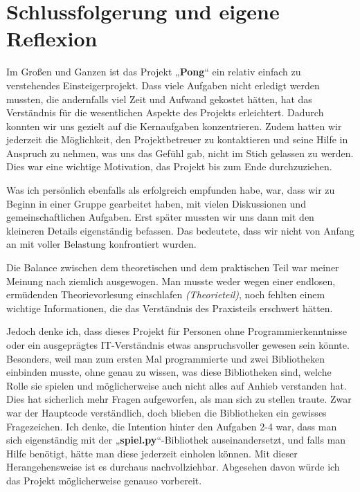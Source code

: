\documentclass[a4paper,12pt]{article}
\begin{document}
\section{Schlussfolgerung und eigene Reflexion}
Im Großen und Ganzen ist das Projekt „\textbf{Pong}“ ein relativ einfach zu verstehendes Einsteigerprojekt. Dass viele Aufgaben nicht erledigt werden mussten, die andernfalls viel Zeit und Aufwand gekostet hätten, hat das Verständnis für die wesentlichen Aspekte des Projekts erleichtert. Dadurch konnten wir uns gezielt auf die Kernaufgaben konzentrieren. Zudem hatten wir jederzeit die Möglichkeit, den Projektbetreuer zu kontaktieren und seine Hilfe in Anspruch zu nehmen, was uns das Gefühl gab, nicht im Stich gelassen zu werden. Dies war eine wichtige Motivation, das Projekt bis zum Ende durchzuziehen. \par \vspace\baselineskip
Was ich persönlich ebenfalls als erfolgreich empfunden habe, war, dass wir zu Beginn in einer Gruppe gearbeitet haben, mit vielen Diskussionen und gemeinschaftlichen Aufgaben. Erst später mussten wir uns dann mit den kleineren Details eigenständig befassen. Das bedeutete, dass wir nicht von Anfang an mit voller Belastung konfrontiert wurden. \par \vspace\baselineskip
Die Balance zwischen dem theoretischen und dem praktischen Teil war meiner Meinung nach ziemlich ausgewogen. Man musste weder wegen einer endlosen, ermüdenden Theorievorlesung einschlafen \textit{(Theorieteil)}, noch fehlten einem wichtige Informationen, die das Verständnis des Praxisteils erschwert hätten. \par \vspace\baselineskip
Jedoch denke ich, dass dieses Projekt für Personen ohne Programmierkenntnisse oder ein ausgeprägtes IT-Verständnis etwas anspruchsvoller gewesen sein könnte. Besonders, weil man zum ersten Mal programmierte und zwei Bibliotheken einbinden musste, ohne genau zu wissen, was diese Bibliotheken sind, welche Rolle sie spielen und möglicherweise auch nicht alles auf Anhieb verstanden hat. Dies hat sicherlich mehr Fragen aufgeworfen, als man sich zu stellen traute. Zwar war der Hauptcode verständlich, doch blieben die Bibliotheken ein gewisses Fragezeichen. Ich denke, die Intention hinter den Aufgaben 2-4 war, dass man sich eigenständig mit der „\textbf{spiel.py}“-Bibliothek auseinandersetzt, und falls man Hilfe benötigt, hätte man diese jederzeit einholen können. Mit dieser Herangehensweise ist es durchaus nachvollziehbar. Abgesehen davon würde ich das Projekt möglicherweise genauso vorbereit. \par \vspace\baselineskip
\end{document}

